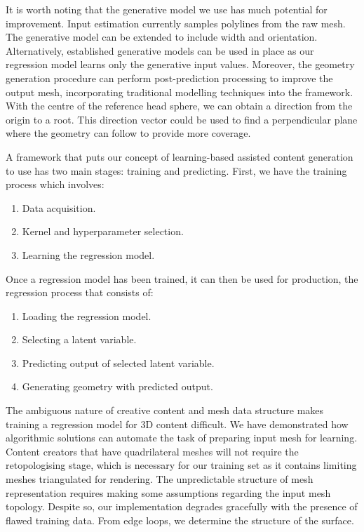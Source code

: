 \documentclass[ %
author={Dillon Keith Diep},
supervisor={Dr. Carl Henrik Ek},
degree={MEng},
title={ART-CG Hair:},
subtitle={Assisted Real-time Content Generation of Stylised Virtual Hair},
type={Research},
year={2017} ]{dissertation}
\begin{document}
	It is worth noting that the generative model we use has much potential for improvement. Input estimation currently samples polylines from the raw mesh. The generative model can be extended to include width and orientation. Alternatively, established generative models can be used in place as our regression model learns only the generative input values. Moreover, the geometry generation procedure can perform post-prediction processing to improve the output mesh, incorporating traditional modelling techniques into the framework. With the centre of the reference head sphere, we can obtain a direction from the origin to a root. This direction vector could be used to find a perpendicular plane where the geometry can follow to provide more coverage.
	
	A framework that puts our concept of learning-based assisted content generation to use has two main stages: training and predicting. First, we have the training process which involves:
	\begin{enumerate}
		\item Data acquisition.
		\item Kernel and hyperparameter selection.
		\item Learning the regression model.
	\end{enumerate}
	Once a regression model has been trained, it can then be used for production, the regression process that consists of:
	\begin{enumerate}
		\item Loading the regression model.
		\item Selecting a latent variable.
		\item Predicting output of selected latent variable.
		\item Generating geometry with predicted output.
	\end{enumerate}
	
	The ambiguous nature of creative content and mesh data structure makes training a regression model for 3D content difficult. We have demonstrated how algorithmic solutions can automate the task of preparing input mesh for learning. Content creators that have quadrilateral meshes will not require the retopologising stage, which is necessary for our training set as it contains limiting meshes triangulated for rendering. The unpredictable structure of mesh representation requires making some assumptions regarding the input mesh topology. Despite so, our implementation degrades gracefully with the presence of flawed training data. From edge loops, we determine the structure of the surface.
	
\end{document}

